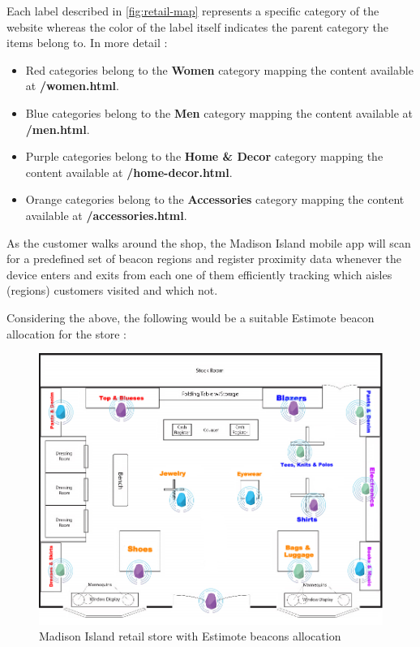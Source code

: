 Each label described in \ref{fig:retail-map} represents a specific category of the website whereas the color of the label itself indicates the parent category the items belong to. In more detail :

\begin{itemize}
  \item Red categories belong to the \textbf{Women} category mapping the content available at \textbf{/women.html}. 
  \item Blue categories belong to the \textbf{Men} category mapping the content available at \textbf{/men.html}.
  \item Purple categories belong to the \textbf{Home \& Decor} category mapping the content available at \textbf{/home-decor.html}. 
  \item Orange categories belong to the \textbf{Accessories} category mapping the content available at \textbf{/accessories.html}. 
\end{itemize}

As the customer walks around the shop, the Madison Island mobile app will scan for a predefined set of beacon regions and register proximity data whenever the device enters and exits from each one of them efficiently tracking which aisles (regions) customers visited and which not. 

Considering the above, the following would be a suitable Estimote beacon allocation for the store :

\vspace{0.5cm}
\begin{figure}[H]
  \centering
    \includegraphics[width=16cm]{images/madison/retail-map-beacon.jpg}
  \caption{Madison Island retail store with Estimote beacons allocation}
  \label{fig:beacons-map}
\end{figure}
\vspace{0.5cm}

